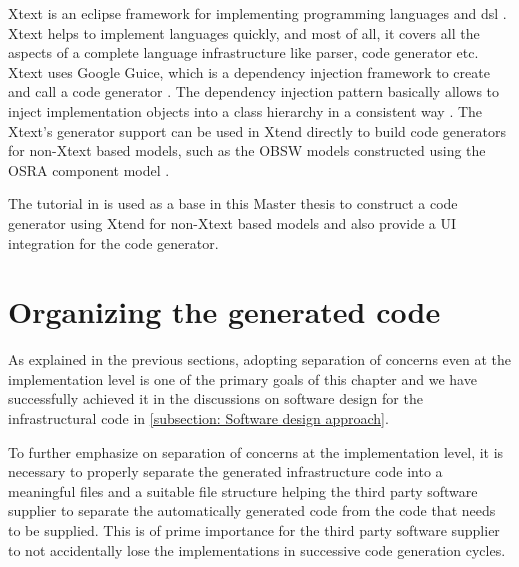 Xtext is an eclipse framework for implementing programming languages and \ac{dsl} \cite{Xtend}. Xtext helps to implement languages quickly, and most of all, it covers all the aspects of a complete language infrastructure like parser, code generator etc. Xtext uses Google Guice, which is a dependency injection framework to create and call a code generator \cite{Xtend}. The dependency injection pattern basically allows to inject implementation objects into a class hierarchy in a consistent way \cite{InvOfCntrlurl}. The Xtext's generator support can be used in Xtend directly to build code generators for non-Xtext based models, such as the OBSW models constructed using the OSRA component model \cite{CodeGenEclXtend}. 

The tutorial in \cite{CodeGenNonXtext} is used as a base in this Master thesis to construct a code generator using Xtend for non-Xtext based models and also provide a UI integration for the code generator.

\section{Organizing the generated code}
\label{section: Code organization}
As explained in the previous sections, adopting separation of concerns even at the implementation level is one of the primary goals of this chapter and we have successfully achieved it in the discussions on software design for the infrastructural code in \cref{subsection: Software design approach}. 

To further emphasize on separation of concerns at the implementation level, it is necessary to properly separate the generated infrastructure code into a meaningful files and a suitable file structure helping the third party software supplier to separate the automatically generated code from the code that needs to be supplied. This is of prime importance for the third party software supplier to not accidentally lose the implementations in successive code generation cycles. 

